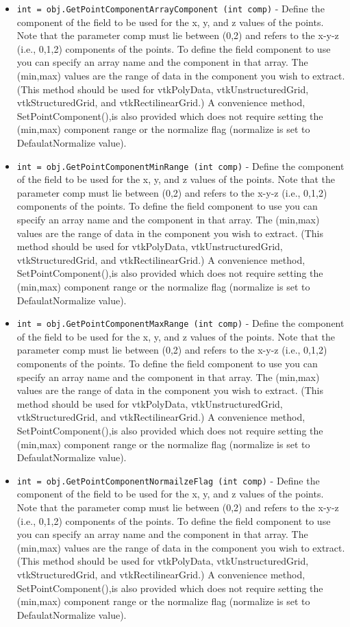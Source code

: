 \begin{itemize}
\item  \verb|int = obj.GetPointComponentArrayComponent (int comp)| -  Define the component of the field to be used for the x, y, and z values
 of the points. Note that the parameter comp must lie between (0,2) and
 refers to the x-y-z (i.e., 0,1,2) components of the points. To define
 the field component to use you can specify an array name and the
 component in that array. The (min,max) values are the range of data in
 the component you wish to extract. (This method should be used for
 vtkPolyData, vtkUnstructuredGrid, vtkStructuredGrid, and
 vtkRectilinearGrid.) A convenience method, SetPointComponent(),is also
 provided which does not require setting the (min,max) component range or
 the normalize flag (normalize is set to DefaulatNormalize value).

\item  \verb|int = obj.GetPointComponentMinRange (int comp)| -  Define the component of the field to be used for the x, y, and z values
 of the points. Note that the parameter comp must lie between (0,2) and
 refers to the x-y-z (i.e., 0,1,2) components of the points. To define
 the field component to use you can specify an array name and the
 component in that array. The (min,max) values are the range of data in
 the component you wish to extract. (This method should be used for
 vtkPolyData, vtkUnstructuredGrid, vtkStructuredGrid, and
 vtkRectilinearGrid.) A convenience method, SetPointComponent(),is also
 provided which does not require setting the (min,max) component range or
 the normalize flag (normalize is set to DefaulatNormalize value).

\item  \verb|int = obj.GetPointComponentMaxRange (int comp)| -  Define the component of the field to be used for the x, y, and z values
 of the points. Note that the parameter comp must lie between (0,2) and
 refers to the x-y-z (i.e., 0,1,2) components of the points. To define
 the field component to use you can specify an array name and the
 component in that array. The (min,max) values are the range of data in
 the component you wish to extract. (This method should be used for
 vtkPolyData, vtkUnstructuredGrid, vtkStructuredGrid, and
 vtkRectilinearGrid.) A convenience method, SetPointComponent(),is also
 provided which does not require setting the (min,max) component range or
 the normalize flag (normalize is set to DefaulatNormalize value).

\item  \verb|int = obj.GetPointComponentNormailzeFlag (int comp)| -  Define the component of the field to be used for the x, y, and z values
 of the points. Note that the parameter comp must lie between (0,2) and
 refers to the x-y-z (i.e., 0,1,2) components of the points. To define
 the field component to use you can specify an array name and the
 component in that array. The (min,max) values are the range of data in
 the component you wish to extract. (This method should be used for
 vtkPolyData, vtkUnstructuredGrid, vtkStructuredGrid, and
 vtkRectilinearGrid.) A convenience method, SetPointComponent(),is also
 provided which does not require setting the (min,max) component range or
 the normalize flag (normalize is set to DefaulatNormalize value).


\end{itemize}
